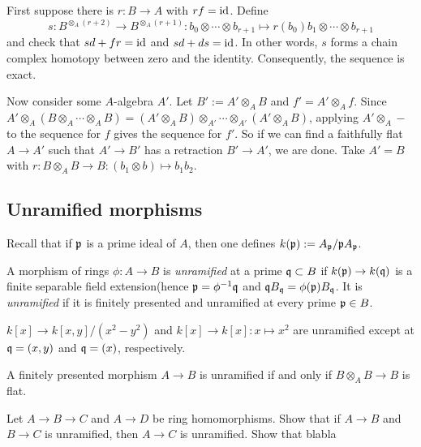 \documentclass{../../../small}
\begin{document}
\begin{pf}
First suppose there is $r:B\to A$ with $rf=\operatorname{id}$.
Define
\[s:B^{\otimes_A(r+2)}\to B^{\otimes_A(r+1)}:b_0\otimes\cdots\otimes b_{r+1}\mapsto r(b_0)b_1\otimes\cdots\otimes b_{r+1}\]
and check that $sd+fr=\operatorname{id}$ and $sd+ds=\operatorname{id}$.
In other words, $s$ forms a chain complex homotopy between zero and the identity.
Consequently, the sequence is exact.

Now consider some $A$-algebra $A'$.
Let $B':=A'\otimes_AB$ and $f'=A'\otimes_Af$.
Since $A'\otimes_A(B\otimes_A\cdots\otimes_AB)=(A'\otimes_AB)\otimes_{A'}\cdots\otimes_{A'}(A'\otimes_AB)$, applying $A'\otimes_A-$ to the sequence for $f$ gives the sequence for $f'$.
So if we can find a faithfully flat $A\to A'$ such that $A'\to B'$ has a retraction $B'\to A'$, we are done.
Take $A'=B$ with $r:B\otimes_AB\to B:(b_1\otimes b)\mapsto b_1b_2$.
\end{pf}


\subsection{Unramified morphisms}
Recall that if $\mathfrak{p}$ is a prime ideal of $A$, then one defines $k(\mathfrak{p}):=A_{\mathfrak{p}}/\mathfrak{p} A_{\mathfrak{p}}$.

\begin{defn*}
A morphism of rings $\phi:A\to B$ is \emph{unramified} at a prime $\mathfrak{q}\subset B$ if $k(\mathfrak{p})\to k(\mathfrak{q})$ is a finite separable field extension(hence $\mathfrak{p}=\phi^{-1}\mathfrak{q}$ and $\mathfrak{q} B_{\mathfrak{q}}=\phi(\mathfrak{p})B_{\mathfrak{q}}$.
It is \emph{unramified} if it is finitely presented and unramified at every prime $\mathfrak{p}\in B$.
\end{defn*}

\begin{ex*}
$k[x]\to k[x,y]/(x^2-y^2)$ and $k[x]\to k[x]:x\mapsto x^2$ are unramified except at $\mathfrak{q}=(x,y)$ and $\mathfrak{q}=(x)$, respectively.
\end{ex*}

\begin{rmk*}
A finitely presented morphism $A\to B$ is unramified if and only if $B\otimes_AB\to B$ is flat.
\end{rmk*}

\begin{exe*}
Let $A\to B\to C$ and $A\to D$ be ring homomorphisms.
Show that if $A\to B$ and $B\to C$ is unramified, then $A\to C$ is unramified.
Show that blabla
\end{exe*}
\end{document}
